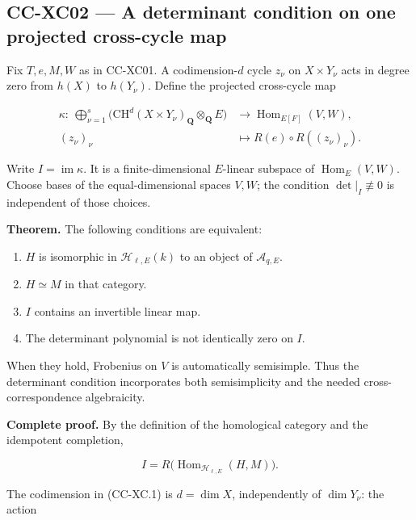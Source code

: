 \documentclass[11pt,a4paper]{article}
\providecommand{\tightlist}{\setlength{\itemsep}{0pt}\setlength{\parskip}{0pt}}
\theoremstyle{definition}\newtheorem{definition}[theorem]{Definition}
\theoremstyle{remark}\newtheorem{remark}[theorem]{Remark}
\begin{document}
\subsection{CC-XC02 --- A determinant condition on one projected
cross-cycle
map}\label{cc-xc02-a-determinant-condition-on-one-projected-cross-cycle-map}

Fix \(T,e,M,W\) as in CC-XC01. A codimension-\(d\) cycle \(z_\nu\) on
\(X\times Y_\nu\) acts in degree zero from \(h(X)\) to \(h(Y_\nu)\).
Define the projected cross-cycle map

\[
 \begin{split}
 \kappa:\ 
 \bigoplus_{\nu=1}^s
 \bigl(\mathrm{CH}^d(X\times Y_\nu)_{\mathbf Q}
              \otimes_{\mathbf Q}E\bigr)
 &\longrightarrow \operatorname{Hom}_{E[F]}(V,W),\\
 (z_\nu)_\nu&\longmapsto R(e)\circ R((z_\nu)_\nu).
 \end{split}                                      \tag{CC-XC.1}
\]

Write \(I=\operatorname{im}\kappa\). It is a finite-dimensional
\(E\)-linear subspace of \(\operatorname{Hom}_E(V,W)\). Choose bases of
the equal-dimensional spaces \(V,W\); the condition
\(\det|_I\not\equiv0\) is independent of those choices.

\textbf{Theorem.} The following conditions are equivalent:

\begin{enumerate}
\def\labelenumi{\arabic{enumi}.}
\tightlist
\item
  \(H\) is isomorphic in \(\mathcal H_{\ell,E}(k)\) to an object of
  \(\mathcal A_{q,E}\).
\item
  \(H\simeq M\) in that category.
\item
  \(I\) contains an invertible linear map.
\item
  The determinant polynomial is not identically zero on \(I\).
\end{enumerate}

When they hold, Frobenius on \(V\) is automatically semisimple. Thus the
determinant condition incorporates both semisimplicity and the needed
cross-correspondence algebraicity.

\textbf{Complete proof.} By the definition of the homological category
and the idempotent completion,

\[
 I=R\bigl(\operatorname{Hom}_{\mathcal H_{\ell,E}}(H,M)\bigr).
                                                        \tag{CC-XC.2}
\]

The codimension in (CC-XC.1) is \(d=\dim X\), independently of
\(\dim Y_\nu\): the action
\end{document}
